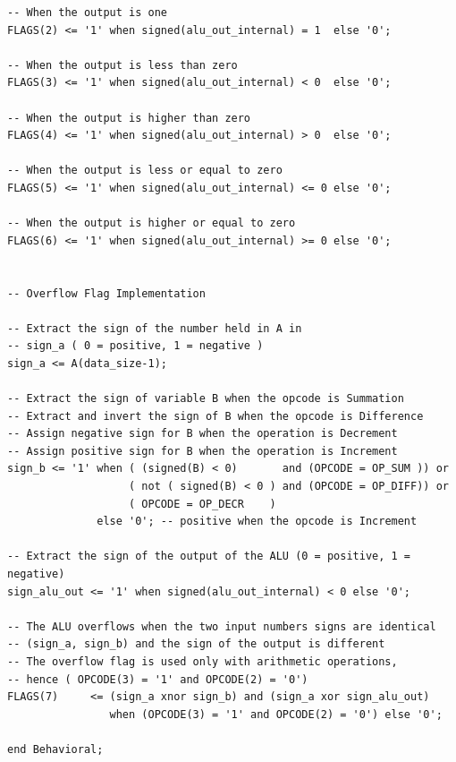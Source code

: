 \documentclass[10pt]{article}
\begin{document}
\begin{verbatim}
-- When the output is one
FLAGS(2) <= '1' when signed(alu_out_internal) = 1  else '0';

-- When the output is less than zero
FLAGS(3) <= '1' when signed(alu_out_internal) < 0  else '0';

-- When the output is higher than zero
FLAGS(4) <= '1' when signed(alu_out_internal) > 0  else '0';

-- When the output is less or equal to zero
FLAGS(5) <= '1' when signed(alu_out_internal) <= 0 else '0';

-- When the output is higher or equal to zero
FLAGS(6) <= '1' when signed(alu_out_internal) >= 0 else '0';        


-- Overflow Flag Implementation

-- Extract the sign of the number held in A in 
-- sign_a ( 0 = positive, 1 = negative ) 
sign_a <= A(data_size-1);

-- Extract the sign of variable B when the opcode is Summation
-- Extract and invert the sign of B when the opcode is Difference
-- Assign negative sign for B when the operation is Decrement
-- Assign positive sign for B when the operation is Increment
sign_b <= '1' when ( (signed(B) < 0)       and (OPCODE = OP_SUM )) or
                   ( not ( signed(B) < 0 ) and (OPCODE = OP_DIFF)) or
                   ( OPCODE = OP_DECR    )
              else '0'; -- positive when the opcode is Increment

-- Extract the sign of the output of the ALU (0 = positive, 1 = negative)
sign_alu_out <= '1' when signed(alu_out_internal) < 0 else '0';

-- The ALU overflows when the two input numbers signs are identical 
-- (sign_a, sign_b) and the sign of the output is different
-- The overflow flag is used only with arithmetic operations, 
-- hence ( OPCODE(3) = '1' and OPCODE(2) = '0')
FLAGS(7)     <= (sign_a xnor sign_b) and (sign_a xor sign_alu_out) 
                when (OPCODE(3) = '1' and OPCODE(2) = '0') else '0';

end Behavioral;


\end{verbatim}
\newpage
\end{document}
